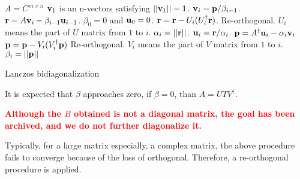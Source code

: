 \begin{algorithm}[H]
\begin{algorithmic}
\State $A=C^{m\times n}$
\State ${\bf v}_1$ is an n-vectors satisfying $||{\bf v} _1|| =1$.
        \State ${\bf v}_i ={\bf p }/\beta _{i-1}$.
    \EndIf
    \State ${\bf r}=A{\bf v}_i - \beta _{i-1}{\bf u}_{i - 1}$.
    \Comment $\beta _0 = 0$ and ${\bf u}_0=0$.
    \State ${\bf r}={\bf r} - U_i (U_i^{\dagger}{\bf r})$.
    \Comment Re-orthogonal. $U_i$ means the part of $U$ matrix from $1$ to $i$.
    \State $\alpha _i = ||{\bf r}||$.
    \State ${\bf u}_i = {\bf r}/\alpha _i$.
        \State ${\bf p} =A^{\dagger}{\bf u}_i - \alpha _i {\bf v}_i$
        \State ${\bf p} ={\bf p} - V_i(V_i^{\dagger}{\bf p})$
        \Comment Re-orthogonal. $V_i$ means the part of $V$ matrix from $1$ to $i$.
        \State $\beta _i = ||{\bf p}||$
    \EndIf
\EndFor
\end{algorithmic}
\caption{\label{alg.LanczosBiorthogonalization1}Lanczos bidiagonalization}
\end{algorithm}

It is expected that $\beta$ approaches zero, if $\beta = 0$, than $A= UT V^{\dagger}$.

\textbf{\textcolor{red}{Although the $B$ obtained is not a diagonal matrix, the goal has been archived, and we do not further diagonalize it.}}

Typically, for a large matrix especially, a complex matrix, the above procedure fails to converge because of the loss of orthogonal.
Therefore, a re-orthogonal procedure is applied.